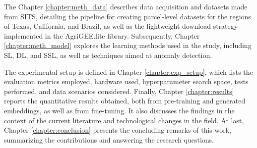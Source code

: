 The Chapter \ref{chapter:meth_data} describes data acquisition and datasets made from \ac{SITS}, detailing the pipeline for creating parcel-level datasets for the regions of Texas, California, and Brazil, as well as the lightweight download strategy implemented in the AgriGEE.lite library. Subsequently, Chapter \ref{chapter:meth_model} explores the learning methods used in the study, including \ac{SL}, \ac{DL}, and \ac{SSL}, as well as techniques aimed at anomaly detection.

The experimental setup is defined in Chapter \ref{chapter:exp_setup}, which lists the evaluation metrics employed, hardware used, hyperparameter search space, tests performed, and data scenarios considered. Finally, Chapter \ref{chapter:results} reports the quantitative results obtained, both from pre-training and generated embeddings, as well as from fine-tuning. It also discusses the findings in the context of the current literature and technological changes in the field. At last, Chapter \ref{chapter:conclusion} presents the concluding remarks of this work, summarizing the contributions and answering the research questions.